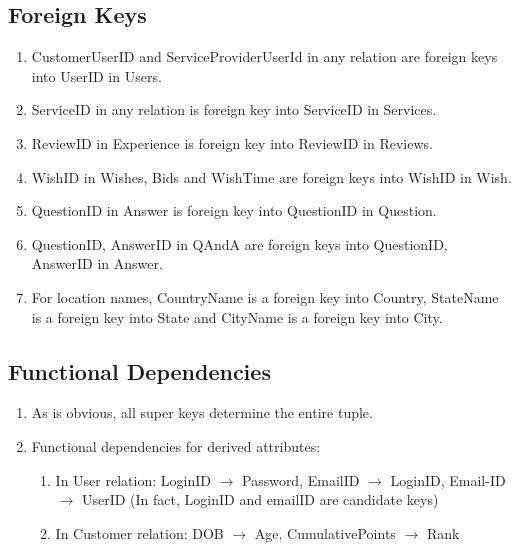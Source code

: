 \documentclass[a4paper]{article}
\begin{document}
\subsection{Foreign Keys}
\begin{enumerate}
\item CustomerUserID and ServiceProviderUserId in any relation are foreign keys into UserID in Users.
\item ServiceID in any relation is foreign key into ServiceID in Services.
\item ReviewID in Experience is foreign key into ReviewID in Reviews.
\item WishID in Wishes, Bids and WishTime are foreign keys into WishID in Wish.
\item QuestionID in Answer is foreign key into QuestionID in Question.
\item QuestionID, AnswerID in QAndA are foreign keys into QuestionID, AnswerID in Answer.
\item For location names, CountryName is a foreign key into Country, StateName is a foreign key into State and CityName is a foreign key into City.
\end{enumerate}



\subsection{Functional Dependencies}
\begin{enumerate}
\item As is obvious, all super keys determine the entire tuple. 
\item Functional dependencies for derived attributes:
\begin{enumerate}
\item In User relation: LoginID $\to$ Password, EmailID $\to$ LoginID, Email-ID $\to$ UserID (In fact, LoginID and emailID are candidate keys)
\item In Customer relation: DOB $\to$ Age,  CumulativePoints $\to$ Rank
\end{enumerate}
\end{enumerate}
\end{document}
